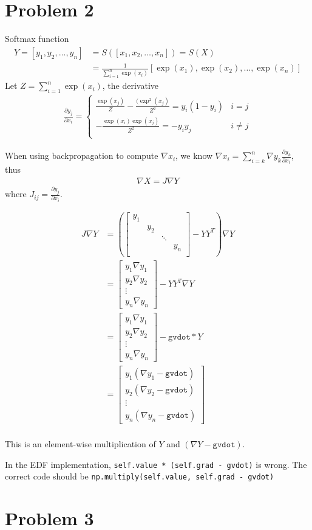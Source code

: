 \documentclass{article}
\begin{document}
\section*{Problem 2}
Softmax function
\begin{align*}
Y = [y_1,y_2,\ldots,y_n] &= S([x_1,x_2,\ldots,x_n]) = S(X)\\
&= \frac{1}{\sum_{i=1}^n
\exp(x_i)}[\exp(x_1),\exp(x_2),\ldots,\exp(x_n)]
\end{align*}
Let $Z = \sum_{i=1}^n\exp(x_i)$, the derivative
\begin{align*}
\frac{\partial y_j}{\partial x_i} =
\left\{
\begin{array}{cc}
\frac{\exp(x_j)}{Z}-\frac{(\exp^2(x_j)}{Z^2} = y_i(1-y_i) & i = j \\
-\frac{\exp(x_i)\exp(x_j)}{Z^2} = -y_iy_j & i \neq j \\
\end{array}
\right.
\end{align*}

When using backpropagation to compute $\nabla x_i$, we know $\nabla x_i =
\sum_{i=k}^n \nabla y_k \frac{\partial y_k}{\partial x_i}$, thus
\begin{align*}
\nabla X = J\nabla Y
\end{align*}
where $J_{ij} = \frac{\partial y_j}{\partial x_i}$.

\begin{align*}
J\nabla Y &= \left(\left[ 
\begin{array}{cccc}
y_1 & & & \\
 &y_2 & &\\
& & \ddots & \\
& & & y_n\\
\end{array}
\right] - YY^T\right)\nabla Y \\
&= \left[\begin{array}{c}y_1\nabla y_1\\y_2\nabla
y_2\\\vdots\\y_n\nabla y_n\end{array}\right] - YY^T\nabla Y\\
&= \left[\begin{array}{c}y_1\nabla y_1\\y_2\nabla
y_2\\\vdots\\y_n\nabla y_n\end{array}\right] - \texttt{gvdot}*Y\\
&=\left[\begin{array}{c}y_1(\nabla y_1 - \texttt{gvdot})\\y_2(\nabla
y_2-\texttt{gvdot})\\\vdots\\y_n(\nabla
y_n-\texttt{gvdot})\end{array}\right]\\
\end{align*}

This is an element-wise multiplication of $Y$ and $(\nabla Y - \texttt{gvdot})$.

In the EDF implementation, \texttt{self.value *
(self.grad - gvdot)} is wrong. The correct code should be
\texttt{np.multiply(self.value, self.grad - gvdot)}

\section*{Problem 3}
\end{document}
